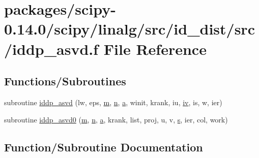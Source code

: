 \hypertarget{iddp__asvd_8f}{}\section{packages/scipy-\/0.14.0/scipy/linalg/src/id\+\_\+dist/src/iddp\+\_\+asvd.f File Reference}
\label{iddp__asvd_8f}
\subsection*{Functions/\+Subroutines}
\begin{DoxyCompactItemize}
\item 
subroutine \hyperlink{iddp__asvd_8f_a313961c73a8069f2993f72c5df945cd7}{iddp\+\_\+asvd} (lw, eps, \hyperlink{indexexpr_8h_ab72fdb4031d47b75ab26dd18a437bcdc}{m}, \hyperlink{indexexpr_8h_ab427e2e2b4d6cec55fa088ea2a692ace}{n}, \hyperlink{gen__mat5files_8m_aae328bf20413f220e38aec4d95bfd6da}{a}, winit, krank, iu, \hyperlink{cephes_8h_ad4b28607832b258aa453374d01dfe8c5}{iv}, is, w, ier)
\item 
subroutine \hyperlink{iddp__asvd_8f_a6e7247b37e62f8ad6d4b2b2aaf2281a4}{iddp\+\_\+asvd0} (\hyperlink{indexexpr_8h_ab72fdb4031d47b75ab26dd18a437bcdc}{m}, \hyperlink{indexexpr_8h_ab427e2e2b4d6cec55fa088ea2a692ace}{n}, \hyperlink{gen__mat5files_8m_aae328bf20413f220e38aec4d95bfd6da}{a}, krank, list, proj, u, v, \hyperlink{indexexpr_8h_ae024b0db549122b44c349ae28ec990dc}{s}, ier, col, work)
\end{DoxyCompactItemize}


\subsection{Function/\+Subroutine Documentation}
\hypertarget{iddp__asvd_8f_a313961c73a8069f2993f72c5df945cd7}{}

